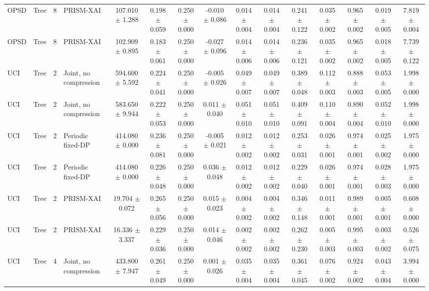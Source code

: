 \begin{table}[t]
\begin{tabular}{llllccccccccccc}
OPSD & Tree & 8 & PRISM-XAI & 107.010 $\pm$ 1.288 & 0.198 $\pm$ 0.059 & 0.250 $\pm$ 0.000 & -0.010 $\pm$ 0.086 & 0.014 $\pm$ 0.004 & 0.014 $\pm$ 0.004 & 0.241 $\pm$ 0.122 & 0.035 $\pm$ 0.002 & 0.965 $\pm$ 0.002 & 0.019 $\pm$ 0.005 & 7.819 $\pm$ 0.004 \\
OPSD & Tree & 8 & PRISM-XAI & 102.909 $\pm$ 0.895 & 0.183 $\pm$ 0.061 & 0.250 $\pm$ 0.000 & -0.027 $\pm$ 0.096 & 0.014 $\pm$ 0.006 & 0.014 $\pm$ 0.006 & 0.236 $\pm$ 0.121 & 0.035 $\pm$ 0.002 & 0.965 $\pm$ 0.002 & 0.018 $\pm$ 0.005 & 7.739 $\pm$ 0.122 \\
UCI & Tree & 2 & Joint, no compression & 594.600 $\pm$ 5.592 & 0.224 $\pm$ 0.041 & 0.250 $\pm$ 0.000 & -0.005 $\pm$ 0.026 & 0.049 $\pm$ 0.007 & 0.049 $\pm$ 0.007 & 0.389 $\pm$ 0.048 & 0.112 $\pm$ 0.003 & 0.888 $\pm$ 0.003 & 0.053 $\pm$ 0.005 & 1.998 $\pm$ 0.000 \\
UCI & Tree & 2 & Joint, no compression & 583.650 $\pm$ 9.944 & 0.222 $\pm$ 0.053 & 0.250 $\pm$ 0.000 & 0.011 $\pm$ 0.040 & 0.051 $\pm$ 0.010 & 0.051 $\pm$ 0.010 & 0.409 $\pm$ 0.091 & 0.110 $\pm$ 0.004 & 0.890 $\pm$ 0.004 & 0.052 $\pm$ 0.010 & 1.998 $\pm$ 0.000 \\
UCI & Tree & 2 & Periodic fixed-DP & 414.080 $\pm$ 0.000 & 0.236 $\pm$ 0.081 & 0.250 $\pm$ 0.000 & -0.005 $\pm$ 0.021 & 0.012 $\pm$ 0.002 & 0.012 $\pm$ 0.002 & 0.253 $\pm$ 0.031 & 0.026 $\pm$ 0.001 & 0.974 $\pm$ 0.001 & 0.025 $\pm$ 0.002 & 1.975 $\pm$ 0.000 \\
UCI & Tree & 2 & Periodic fixed-DP & 414.080 $\pm$ 0.000 & 0.226 $\pm$ 0.048 & 0.250 $\pm$ 0.000 & 0.036 $\pm$ 0.048 & 0.012 $\pm$ 0.002 & 0.012 $\pm$ 0.002 & 0.229 $\pm$ 0.040 & 0.026 $\pm$ 0.001 & 0.974 $\pm$ 0.001 & 0.028 $\pm$ 0.003 & 1.975 $\pm$ 0.000 \\
UCI & Tree & 2 & PRISM-XAI & 19.704 $\pm$ 0.072 & 0.265 $\pm$ 0.056 & 0.250 $\pm$ 0.000 & 0.015 $\pm$ 0.023 & 0.004 $\pm$ 0.002 & 0.004 $\pm$ 0.002 & 0.346 $\pm$ 0.148 & 0.011 $\pm$ 0.001 & 0.989 $\pm$ 0.001 & 0.005 $\pm$ 0.001 & 0.608 $\pm$ 0.000 \\
UCI & Tree & 2 & PRISM-XAI & 16.336 $\pm$ 3.337 & 0.229 $\pm$ 0.036 & 0.250 $\pm$ 0.000 & 0.014 $\pm$ 0.046 & 0.002 $\pm$ 0.002 & 0.002 $\pm$ 0.002 & 0.262 $\pm$ 0.230 & 0.005 $\pm$ 0.003 & 0.995 $\pm$ 0.003 & 0.003 $\pm$ 0.002 & 0.526 $\pm$ 0.075 \\
UCI & Tree & 4 & Joint, no compression & 433.800 $\pm$ 7.947 & 0.261 $\pm$ 0.049 & 0.250 $\pm$ 0.000 & 0.001 $\pm$ 0.026 & 0.035 $\pm$ 0.004 & 0.035 $\pm$ 0.004 & 0.361 $\pm$ 0.045 & 0.076 $\pm$ 0.002 & 0.924 $\pm$ 0.002 & 0.043 $\pm$ 0.004 & 3.994 $\pm$ 0.000 \\

\end{tabular}
\end{table}
